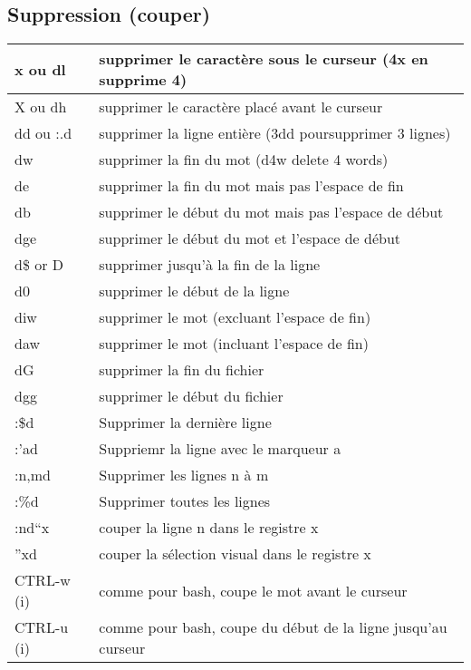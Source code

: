 \documentclass{article}
\begin{document}
                            \subsection{Suppression (couper)}
                            \begin{tabular}{|p{3cm}| l| }\hline
                                x ou dl & supprimer le caractère sous le curseur (4x en supprime 4)\\ \hline
                                X ou dh & supprimer le caractère placé avant le curseur\\ \hline
                                dd ou :.d & supprimer la ligne entière (3dd poursupprimer 3 lignes)\\ \hline
                                dw & supprimer la fin du mot (d4w delete 4 words)\\ \hline
                                de & supprimer la fin du mot mais pas l'espace de fin \\ \hline
                                db & supprimer le début du mot mais pas l'espace de début\\ \hline
                                dge & supprimer le début du mot et l'espace de début\\ \hline
                                d\$ or D & supprimer jusqu'à la fin de la ligne\\ \hline
                                d0 & supprimer le début de la ligne\\ \hline
                                diw & supprimer le mot (excluant l'espace de fin)\\ \hline
                                daw & supprimer le mot (incluant l'espace de fin)\\ \hline
                                dG & supprimer la fin du fichier\\ \hline
                                dgg & supprimer le début du fichier\\ \hline
                                :\$d & Supprimer la dernière ligne \\ \hline
                                :'ad & Suppriemr la ligne avec le marqueur a \\ \hline
                                :n,md & Supprimer les lignes n à m \\ \hline
                                :\%d & Supprimer toutes les lignes  \\ \hline
                                :nd``x & couper la ligne n dans le registre x\\ \hline
                                ''xd & couper la sélection visual dans le registre x\\ \hline
                                CTRL-w (i)& comme pour bash, coupe le mot avant le curseur\\ \hline
                                CTRL-u (i)& comme pour bash, coupe du début de la ligne jusqu'au curseur \\ \hline 
                            \end{tabular}\\
\end{document}
